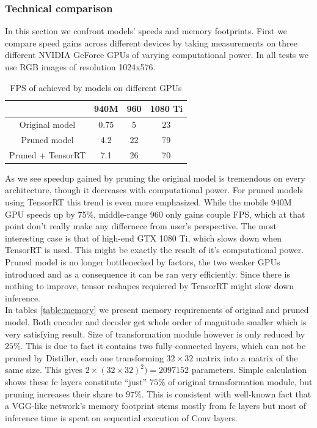 \documentclass[../Main.tex]{subfiles}
\begin{document}
\subsubsection{Technical comparison}
In this section we confront models' speeds and memory footprints.
First we compare speed gains across different devices by taking measurements on three different
NVIDIA GeForce GPUs of varying computational power. In all tests we use RGB images
of resolution 1024x576. 
\begin{table}
\begin{center}
\begin{tabular}{|c|c|c|c|}
\hline
                  &  940M & 960 & 1080 Ti \\
\hline
Original model    &  0.75 & 5   & 23 \\
\hline
Pruned model      &  4.2  & 22  & 79 \\
\hline
Pruned + TensorRT &  7.1  & 26  & 70 \\
\hline
\end{tabular}
\end{center}
\caption{\label{table:speedup} FPS of achieved by models on different GPUs}
\end{table}
As we see speedup gained by pruning the original model is tremendous on
every architecture, though it decreases with computational power.
For pruned models using TensorRT this trend is even more emphasized.
While the mobile 940M GPU speeds up by 75\%, middle-range 960 only gains
couple FPS, which at that point don't really make any differnece from user's
perspective. The most
interesting case is that of high-end GTX 1080 Ti, which slows down
when TensorRT is used. This might be exactly the result of it's computational power.
Pruned model is no longer bottlenecked by factors, the two weaker GPUs
introduced and as a consequence it can be ran very efficiently.
Since there is nothing to improve, tensor reshapes requiered by TensorRT
might slow down inference. \\
In tables \ref{table:memory} we present memory requirements of original and pruned model.
Both encoder and decoder get whole order of magnitude smaller which is very
satisfying result. Size of transformation module however is only reduced by $25\%$.
This is due to fact it contains two fully-connected layers, which
can not be pruned by Distiller, each one
transforming $32\times32$ matrix into a matrix of the same size.
This gives $2\times\left(32\times32\right)^2)=2097152$ parameters.
Simple calculation shows these fc layers constitute ``just'' $75\%$
of original transformation module, but pruning increases their share to 
$97\%$. This is consistent with well-known fact that a VGG-like network's
memory footprint stems mostly from fc layers but most of inference time
is spent on sequential execution of Conv layers.
\end{document}
